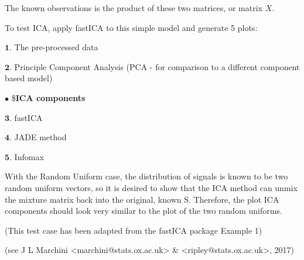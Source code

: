 \documentclass[12pt,twoside]{amherstthesis}
\begin{document}
  The known observations is the product of these two matrices, or matrix
  \(X\). \newline
  
  To test ICA, apply fastICA to this simple model and generate 5 plots:
  \newline
  
  \(\textbf{1.}\) The pre-processed data \newline
  
  \(\textbf{2.}\) Principle Component Analysis (PCA - for comparison to a
  different component based model) \newline
  
  \(\bullet\) \$\textbf{ICA components} \newline 
  
  \(\textbf{3.}\) fastICA
  
  \(\textbf{4.}\) JADE method
  
  \(\textbf{5.}\) Infomax
  
  With the Random Uniform case, the distribution of signals is known to be
  two random uniform vectors, so it is desired to show that the ICA method
  can unmix the mixture matrix back into the original, known S. Therefore,
  the plot ICA components should look very similar to the plot of the two
  random uniforms.
  
  (This test case has been adapted from the fastICA package Example 1)
  
  (see J L Marchini \textless{}marchini@stats.ox.ac.uk\textgreater{} \&
  \textless{}ripley@stats.ox.ac.uk\textgreater{}, 2017)
  
\end{document}
